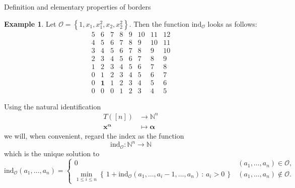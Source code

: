 \documentclass[reqno,a4paper,10pt]{amsart}
\theoremstyle{definition}
\newtheorem{example}[definition]{Example}
\theoremstyle{remark}
\theoremstyle{plain}
\newcommand{\set}[1]{\left\{{#1}\right\}}
\newcommand{\vek}[1]{\boldsymbol{#1}}
\newcommand\setsuchas[2]{\left\{\,{#1}\,:\,{#2}\,\right\}}
\newcommand{\Nat}{{\mathbb{N}}}
\newcommand{\ind}{\mathrm{ind}}
\begin{document}
\begin{section}{Definition and elementary properties of borders}
  \begin{example}\label{ex:311}
   Let \(\mathcal{O}=\set{1,x_1,x_1^2,x_2,x_2^2}\). 
    Then the function \(\ind_{\mathcal{O}}\) looks as follows:
    \begin{displaymath}
      \begin{matrix}
        5 & 6 & 7 & 8 & 9 & 10 & 11 & 12 \\ 
        4 & 5 & 6 & 7 & 8 & 9 & 10 & 11  \\
        3 & 4 & 5 & 6 & 7 & 8 & 9 & 10   \\
        2 & 3 & 4 & 5 & 6 & 7 & 8 & 9    \\
        1 & 2 & 3 & 4 & 5 & 6 & 7 & 8    \\
        0 & 1 & 2 & 3 & 4 & 5 & 6 & 7    \\
        0 & \vek{1} & 1 & 2 & 3 & 4 & 5 & 6    \\
        0 & 0 & 0 & 1 & 2 & 3 & 4 & 5
      \end{matrix}
    \end{displaymath}
  \end{example}

  Using the natural identification
  \begin{displaymath}
    \begin{split}
      T([n]) & \to \Nat^n \\
      \vek{x}^{\vek{\alpha}} & \mapsto \vek{\alpha}
    \end{split}
  \end{displaymath}
  we will, when convenient, regard the index as the function
  \begin{displaymath}
    \ind_{\mathcal{O}}: \Nat^n \to \Nat
  \end{displaymath}
  which is the unique solution to 
  \begin{equation}
  \label{eq:diffeq}
  \ind_{\mathcal{O}}(a_1,\dots,a_n) =
  \begin{cases}
    0 & (a_1,\dots,a_n) \in \mathcal{O}, \\
    \displaystyle \min_{1 \le i \le n}
    \setsuchas{1+\ind_{\mathcal{O}}(a_1,\dots,a_i-1,\dots,a_n)}{a_i>0} & (a_1,\dots,a_n) \not \in \mathcal{O}.
  \end{cases}
    \end{equation}
\end{section}
\end{document}

